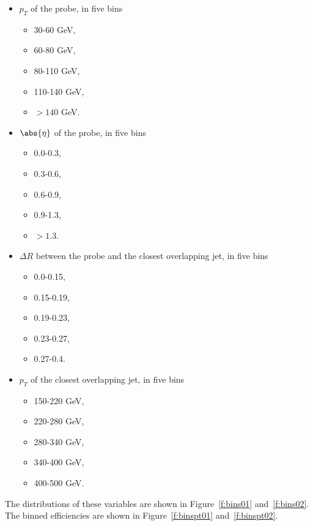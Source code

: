 \begin{itemize}
	\item $p_T$ of the probe, in five bins
	      \begin{itemize}
		      \item 30-60 GeV,
		      \item 60-80 GeV,
		      \item 80-110 GeV,
		      \item 110-140 GeV,
		      \item $> 140$ GeV.
	      \end{itemize}
	\item $\abs{\eta}$ of the probe, in five bins
	      \begin{itemize}
		      \item 0.0-0.3,
		      \item 0.3-0.6,
		      \item 0.6-0.9,
		      \item 0.9-1.3,
		      \item $> 1.3$.
	      \end{itemize}
	\item $\Delta R $ between the probe and the closest overlapping jet, in five bins
	      \begin{itemize}
		      \item 0.0-0.15,
		      \item 0.15-0.19,
		      \item 0.19-0.23,
		      \item 0.23-0.27,
		      \item 0.27-0.4.
	      \end{itemize}
	\item $p_T$ of the closest overlapping jet, in five bins
	      \begin{itemize}
		      \item 150-220 GeV,
		      \item 220-280 GeV,
		      \item 280-340 GeV,
		      \item 340-400 GeV,
		      \item 400-500 GeV.
	      \end{itemize}
\end{itemize}

The distributions of these variables are shown in Figure~\ref{f:bins01} and~\ref{f:bins02}.
The binned efficiencies are shown in Figure~\ref{f:binspt01} and~\ref{f:binspt02}.


